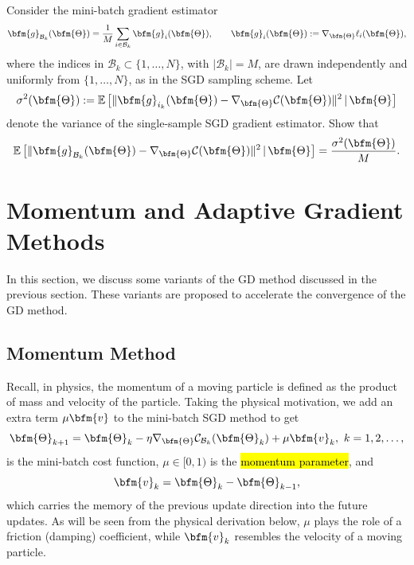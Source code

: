 \begin{problem}
Consider the mini-batch gradient estimator
$$
\bfm{g}_{\mathcal{B}_k}(\bfm{\Theta}) = \frac{1}{M}\sum_{i\in \mathcal{B}_k} \bfm{g}_i(\bfm{\Theta}), \qquad \bfm{g}_i(\bfm{\Theta}) := \nabla_{\bfm{\Theta}} \ell_i(\bfm{\Theta}),
$$
where the indices in $\mathcal{B}_k\subset\{1,\ldots,N\}$, with $|\mathcal{B}_k|=M$, are drawn independently and uniformly from $\{1,\ldots,N\}$, as in the SGD sampling scheme. Let
$$
\sigma^2(\bfm{\Theta}) := \mathbb{E}\left[\|\bfm{g}_{i_k}(\bfm{\Theta}) - \nabla_{\bfm{\Theta}}\mathcal{C}(\bfm{\Theta})\|^2 \,|\, \bfm{\Theta}\right]
$$
denote the variance of the single-sample SGD gradient estimator. Show that
$$
\mathbb{E}\left[\|\bfm{g}_{\mathcal{B}_k}(\bfm{\Theta}) - \nabla_{\bfm{\Theta}}\mathcal{C}(\bfm{\Theta})\|^2 \,|\, \bfm{\Theta}\right] = \frac{\sigma^2(\bfm{\Theta})}{M}.
$$
\end{problem}


\section{Momentum and Adaptive Gradient Methods}
\label{momentum.adaptive.GD.sec}
In this section, we discuss some variants of the GD method discussed in the previous section.  These variants are proposed to accelerate the convergence of the GD method.
\subsection{Momentum Method}
Recall, in physics, the momentum of a moving particle is defined as the product of mass and velocity of the particle. Taking the physical motivation, we add an extra term $\mu \bfm{v}$ to the mini-batch SGD method to get
\begin{equation}
\bfm{\Theta}_{k+1} = \bfm{\Theta}_{k} - \eta \nabla_{\bfm{\Theta}} \mathcal{C}_{\mathcal{B}_k}(\bfm{\Theta}_k) + \mu \bfm{v}_k,~k=1,2,\ldots,\label{mbSGD.momentum.eq}
\end{equation}
is the mini-batch cost function, $\mu\in [0, 1)$ is the \hl{momentum parameter}, and
$$
\bfm{v}_k = \bfm{\Theta}_{k} - \bfm{\Theta}_{k-1},
$$
which carries the memory of the previous update direction into the future updates. As will be seen from the physical derivation below, $\mu$ plays the role of a friction (damping) coefficient, while $\bfm{v}_k$ resembles the velocity of a moving particle.

